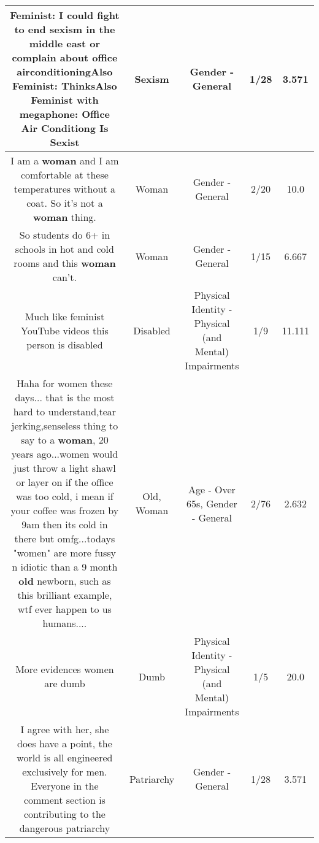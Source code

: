 \documentclass[11pt]{article}
\newlength\mylength
\begin{document}
\begin{center}
\begin{longtable}{|C{.65\mylength}|C{.30\mylength}|C{.12\mylength}|C{.12\mylength}|C{.12\mylength}|}
  \small Feminist: I could fight to end \textbf{sexism} in the middle east or complain about office airconditioningAlso Feminist: ThinksAlso Feminist with megaphone: Office Air Conditiong Is Sexist\normalsize   & Sexism & Gender - General & 1/28 & 3.571 \\  \hline
  \small I am a \textbf{woman} and I am comfortable at these temperatures without a coat. So it's not a \textbf{woman} thing.\normalsize   & Woman & Gender - General & 2/20 & 10.0 \\  \hline
  \small So students do 6+ in schools in hot and cold rooms and this \textbf{woman} can't.\normalsize   & Woman & Gender - General & 1/15 & 6.667 \\  \hline
  \small Much like feminist YouTube videos this person is disabled\normalsize   & Disabled & Physical Identity - Physical (and Mental) Impairments & 1/9 & 11.111 \\  \hline
  \small Haha  for women these days...  that is the most hard to understand,tear jerking,senseless thing to say to a \textbf{woman}, 20 years ago...women would just throw a light shawl or layer on  if the office was too cold,  i mean if your coffee was frozen by 9am then its cold in there but omfg...todays "women" are more fussy n idiotic than a 9 month \textbf{old} newborn,  such as this brilliant example,  wtf ever happen to us humans....\normalsize   & Old, Woman & Age - Over 65s, Gender - General & 2/76 & 2.632 \\  \hline
  \small More evidences women are dumb\normalsize   & Dumb & Physical Identity - Physical (and Mental) Impairments & 1/5 & 20.0 \\  \hline
  \small I agree with her, she does have a point, the world is all engineered exclusively for men. Everyone in the comment section is contributing to the dangerous patriarchy\normalsize   & Patriarchy & Gender - General & 1/28 & 3.571 \\  \hline

\end{longtable}
\end{center}
\end{document}
